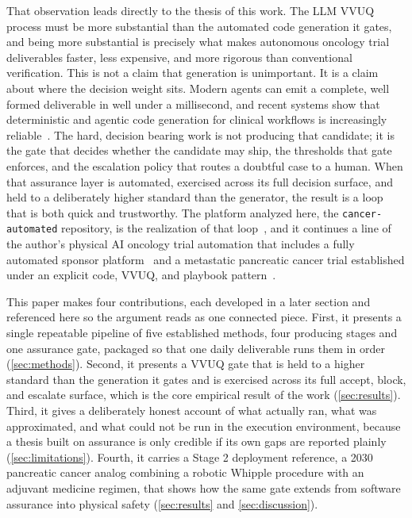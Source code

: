 That observation leads directly to the thesis of this work. The LLM VVUQ process
must be more substantial than the automated code generation it gates, and being
more substantial is precisely what makes autonomous oncology trial deliverables
faster, less expensive, and more rigorous than conventional verification. This is
not a claim that generation is unimportant. It is a claim about where the
decision weight sits. Modern agents can emit a complete, well formed deliverable
in well under a millisecond, and recent systems show that deterministic and
agentic code generation for clinical workflows is increasingly
reliable~\cite{trooskens2026compiled, carlisle2026pipeline, yan2026clinagent}.
The hard, decision bearing work is not producing that candidate; it is the gate
that decides whether the candidate may ship, the thresholds that gate enforces,
and the escalation policy that routes a doubtful case to a human. When that
assurance layer is automated, exercised across its full decision surface, and
held to a deliberately higher standard than the generator, the result is a loop
that is both quick and trustworthy. The platform analyzed here, the
\texttt{cancer-automated} repository, is the realization of that
loop~\cite{repo-cancer-automated}, and it continues a line of the author's
physical AI oncology trial automation that includes a fully automated sponsor
platform~\cite{kawchak2026sponsor} and a metastatic pancreatic cancer trial
established under an explicit code, VVUQ, and playbook
pattern~\cite{kawchak2025qsppdac}.

This paper makes four contributions, each developed in a later section and
referenced here so the argument reads as one connected piece. First, it presents
a single repeatable pipeline of five established methods, four producing stages
and one assurance gate, packaged so that one daily deliverable runs them in order
(\autoref{sec:methods}). Second, it presents a VVUQ gate that is held to a higher
standard than the generation it gates and is exercised across its full accept,
block, and escalate surface, which is the core empirical result of the work
(\autoref{sec:results}). Third, it gives a deliberately honest account of what
actually ran, what was approximated, and what could not be run in the execution
environment, because a thesis built on assurance is only credible if its own gaps
are reported plainly (\autoref{sec:limitations}). Fourth, it carries a Stage 2
deployment reference, a 2030 pancreatic cancer analog combining a robotic Whipple
procedure with an adjuvant medicine regimen, that shows how the same gate extends
from software assurance into physical safety (\autoref{sec:results} and
\autoref{sec:discussion}).

